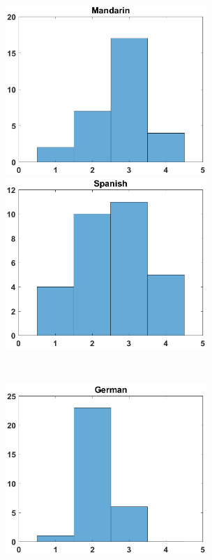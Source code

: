 \begin{figure}[h]
        \begin{minipage}[t]{0.5\linewidth}
        \centering
            \includegraphics[width=3in]{figures/Mandarin_hist.eps}
        \end{minipage}%
        \begin{minipage}[t]{0.5\linewidth}
        \centering
            \includegraphics[width=3in]{figures/Spanish_hist.eps}
        \end{minipage}%
        \\
        \begin{minipage}[t]{0.5\linewidth}
        \centering
            \includegraphics[width=3in]{figures/German_hist.eps}

\end{minipage}
\end{figure}
